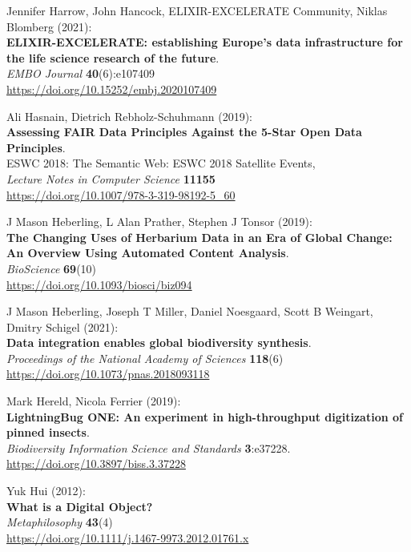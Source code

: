 \begin{thebibliography}{9}
Jennifer Harrow, John Hancock, ELIXIR-EXCELERATE Community,
Niklas Blomberg (2021):\\
\textbf{ELIXIR-EXCELERATE: establishing Europe's data
infrastructure for the life science research of the future}.\\
\emph{EMBO Journal} \textbf{40}(6):e107409\\
\url{https://doi.org/10.15252/embj.2020107409}

Ali Hasnain, Dietrich Rebholz-Schuhmann (2019):\\
\textbf{Assessing FAIR Data Principles Against the 5-Star Open Data
Principles}.\\
ESWC 2018: The Semantic Web: ESWC 2018 Satellite Events,\\
\emph{Lecture Notes in Computer Science} \textbf{11155}\\
\url{https://doi.org/10.1007/978-3-319-98192-5_60}

J Mason Heberling, L Alan Prather, Stephen J Tonsor (2019):\\
\textbf{The Changing Uses of Herbarium Data in an Era of Global Change: An Overview
Using Automated Content Analysis}.\\
\emph{BioScience} \textbf{69}(10)\\
\url{https://doi.org/10.1093/biosci/biz094}

J Mason Heberling, Joseph T Miller, Daniel Noesgaard, Scott B Weingart, Dmitry Schigel (2021):\\
\textbf{Data integration enables global biodiversity
synthesis}.\\
\emph{Proceedings of the National Academy of Sciences} \textbf{118}(6)\\
\url{https://doi.org/10.1073/pnas.2018093118}

Mark Hereld, Nicola Ferrier (2019):\\
\textbf{LightningBug ONE: An experiment in high-throughput digitization of pinned insects}.\\
\emph{Biodiversity Information Science and Standards} \textbf{3}:e37228.\\
\url{https://doi.org/10.3897/biss.3.37228}

Yuk Hui (2012):\\
\textbf{What is a Digital Object?}\\
\emph{Metaphilosophy} \textbf{43}(4)\\
\url{https://doi.org/10.1111/j.1467-9973.2012.01761.x}


\end{thebibliography}
